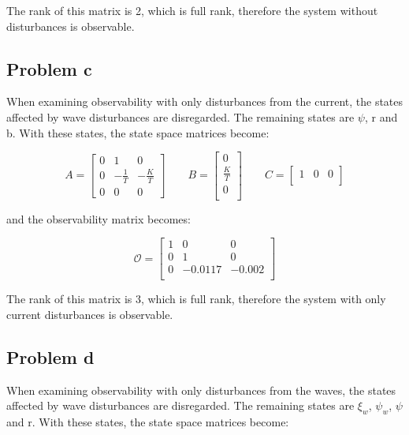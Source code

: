 The rank of this matrix is 2, which is full rank, therefore the system without disturbances is observable.

\subsection{Problem c}
When examining observability with only disturbances from the current, the states affected by wave disturbances are disregarded. The remaining states are $\psi$, r and b. With these states, the state space matrices become:

\begin{equation}
    A = 
	\begin{bmatrix}
    0 & 1            & 0\\
	0 & -\frac{1}{T} & -\frac{K}{T}\\
	0 & 0            & 0
	\end{bmatrix}
  \qquad
  B =
  \begin{bmatrix}
	0 \\
    \frac{K}{T} \\
    0 \\
  \end{bmatrix}
  \qquad
  C =
  \begin{bmatrix}
    1 & 0 & 0\\
  \end{bmatrix}
\end{equation}

and the observability matrix becomes:

\begin{equation}
  \bm{\mathcal{O}} =
  \begin{bmatrix}
    1 & 0       & 0\\
    0 & 1       & 0\\
    0 & -0.0117 & -0.002 \\
  \end{bmatrix}
\end{equation}

The rank of this matrix is 3, which is full rank, therefore the system with only current disturbances is observable.

\subsection{Problem d}
When examining observability with only disturbances from the waves, the states affected by wave disturbances are disregarded. The remaining states are $\xi_w$, $\psi_w$, $\psi$ and r. With these states, the state space matrices become:

